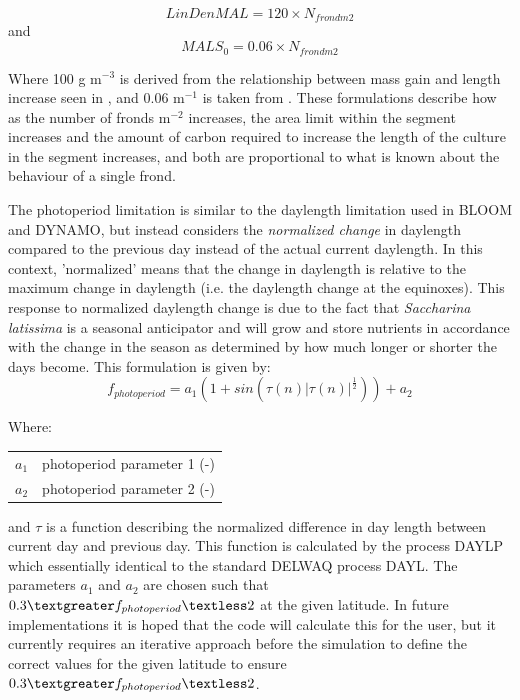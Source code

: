 \documentclass{deltares_manual}
\begin{document}
\begin{equation}
LinDenMAL = 120 \times N_{frondm2}
\end{equation}
and
\begin{equation}
MALS_0 = 0.06 \times N_{frondm2}
\end{equation}

Where 100 g m$^{-3}$ is derived from the relationship between mass gain and length increase seen in \cite{sjotun1993}, and 0.06 m$^{-1}$ is taken from \cite{broch2012}. These formulations describe how as the number of fronds m$^{-2}$ increases, the area limit within the segment increases and the amount of carbon required to increase the length of the culture in the segment increases, and both are proportional to what is known about the behaviour of a single frond.

The photoperiod limitation is similar to the daylength limitation used in BLOOM and DYNAMO, but instead considers the \textit{normalized change} in daylength compared to the previous day instead of the actual current daylength. In this context, 'normalized' means that the change in daylength is relative to the maximum change in daylength (i.e. the daylength change at the equinoxes). This response to normalized daylength change is due to the fact that \textit{Saccharina latissima} is a seasonal anticipator and will grow and store nutrients in accordance with the change in the season as determined by how much longer or shorter the days become. This formulation is given by: 
\begin{equation}
f_{photoperiod} = a_1 (1+sin(\tau (n) | \tau (n)| ^{\frac{1}{2}})) + a_2
\end{equation}

Where:\\

\begin{tabular}{ll}
	$a_1$    & photoperiod parameter 1 (-)\\
	$a_2$    & photoperiod parameter 2 (-)\\
\end{tabular}

and $\tau$ is a function describing the normalized difference in day length between current day and previous day. This function is calculated by the process DAYLP which essentially identical to the standard DELWAQ process DAYL. The parameters $a_1$ and $a_2$ are chosen such that $0.3 \textgreater f_{photoperiod} \textless 2$ at the given latitude. In future implementations it is hoped that the code will calculate this for the user, but it currently requires an iterative approach before the simulation to define the correct values for the given latitude to  ensure $0.3 \textgreater f_{photoperiod} \textless 2$.
\end{document}
